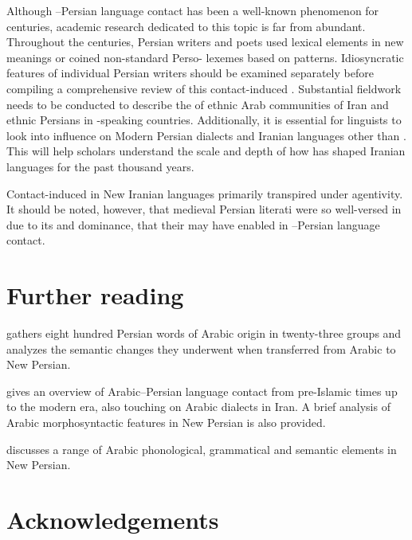 \documentclass[output=paper]{langsci/langscibook}
\begin{document}
Although –Persian language contact has been a well-known phenomenon for centuries, academic research dedicated to this topic is far from abundant. Throughout the centuries, Persian writers and poets used  lexical elements in new meanings or coined non-standard Perso- lexemes based on   patterns. Idiosyncratic features of individual Persian writers should be examined separately before compiling a comprehensive review of this contact-induced . Substantial fieldwork needs to be conducted to describe the  of ethnic Arab communities of Iran and ethnic Persians in -speaking countries. Additionally, it is essential for linguists to look into  influence on Modern Persian dialects and Iranian languages other than . This will help scholars understand the scale and depth of how  has shaped Iranian languages for the past thousand years.

Contact-induced  in New Iranian languages primarily transpired under  agentivity. It should be noted, however, that medieval Persian literati were so well-versed in  due to its  and dominance, that their  may have enabled  in –Persian language contact.

\section*{Further reading}
\begin{furtherreading}
\item[\citet{Asbaghi1987}] gathers eight hundred Persian words of {Arabic} origin in twenty-three groups and analyzes the semantic changes they underwent when transferred from {Arabic} to {New Persian}.
\item[\citet{Gazsi2011}] gives an overview of {Arabic}–Persian language contact from pre-Is\-lam\-ic times up to the modern era, also touching on {Arabic} dialects in Iran. A brief analysis of {Arabic} morphosyntactic features in {New Persian} is also provided.
\item[\citet{Ṣādiqī2011}] discusses a range of {Arabic} phonological, grammatical and semantic elements in {New Persian}.
\end{furtherreading}

\section*{Acknowledgements}
\end{document}

